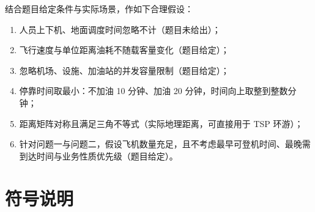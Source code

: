 \documentclass[UTF8,zihao=-4]{ctexart}
\numberwithin{figure}{section}
\numberwithin{table}{section}
\begin{document}
结合题目给定条件与实际场景，作如下合理假设：

\begin{enumerate}
  \item 人员上下机、地面调度时间忽略不计（题目未给出）；
  \item 飞行速度与单位距离油耗不随载客量变化（题目给定）；
  \item 忽略机场、设施、加油站的并发容量限制（题目给定）；
  \item 停靠时间取最小：不加油 10 分钟、加油 20 分钟，时间向上取整到整数分钟；
  \item 距离矩阵对称且满足三角不等式（实际地理距离，可直接用于 TSP 环游）；
  \item 针对问题一与问题二，假设飞机数量充足，且不考虑最早可登机时间、最晚需到达时间与业务性质优先级（题目给定）。
\end{enumerate}

\section{符号说明}
\end{document}
